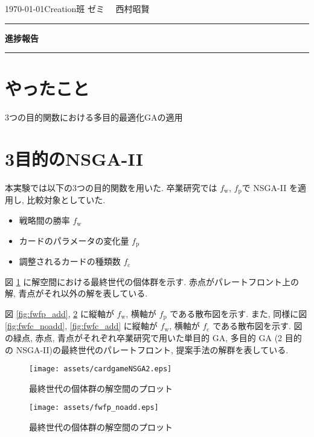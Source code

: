 \documentclass{jarticle}     %
\begin{document}
  \noindent
  \hspace{1em}

  \today Creation班 ゼミ
  \hfill
  \ \  西村昭賢 

  \vspace{2mm}
  \hrule
  \begin{center}
  {\Large \bf 進捗報告}
  \end{center}
  \hrule
  \vspace{3mm}


\section{やったこと}
3つの目的関数における多目的最適化GAの適用

\section{3目的のNSGA-II}
本実験では以下の3つの目的関数を用いた. 卒業研究では $f_\mathrm{w}$, $f_\mathrm{p}$で NSGA-II を適用し, 比較対象としていた.
\begin{itemize}
  \item 戦略間の勝率 $f_\mathrm{w}$
  \item カードのパラメータの変化量 $f_\mathrm{p}$
  \item 調整されるカードの種類数 $f_\mathrm{c}$
\end{itemize}

図 \ref{fig:result} に解空間における最終世代の個体群を示す. 
赤点がパレートフロント上の解, 青点がそれ以外の解を表している.

図 \ref{fig:fwfp_add}, \ref{fig:fwfp_noadd} に縦軸が $f_\mathrm{w}$, 横軸が $f_\mathrm{p}$ である散布図を示す.
また, 同様に図 \ref{fig:fwfc_noadd}, \ref{fig:fwfc_add} に縦軸が $f_\mathrm{w}$, 横軸が $f_\mathrm{c}$ である散布図を示す.
図の緑点, 赤点, 青点がそれぞれ卒業研究で用いた単目的 GA, 多目的 GA (2 目的の NSGA-II)の最終世代のパレートフロント, 提案手法の解群を表している.

\begin{figure}[ht]
  \centering
  \texttt{[image: assets/cardgameNSGA2.eps]}
  \vspace{-0.3cm}
  \caption{最終世代の個体群の解空間のプロット}
  \label{fig:result}
\end{figure}

\begin{figure}[ht]
  \centering
  \texttt{[image: assets/fwfp\_noadd.eps]}
  \vspace{-0.3cm}
  \caption{最終世代の個体群の解空間のプロット}
  \label{fig:fwfp_noadd}
\end{figure}
\end{document}
